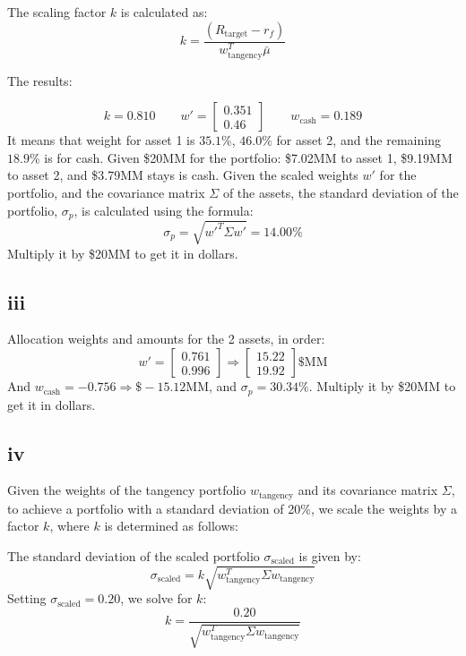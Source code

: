 \documentclass{article}
\begin{document}
The scaling factor \( k \) is calculated as:
\[ k = \frac{(R_{\text{target}} - r_f)}{w_{\text{tangency}}^T \bar{\mu}} \]

The results:

$$k=0.810\qquad w' = \displaystyle \left[\begin{matrix}0.351\\0.46\end{matrix}\right] \qquad w_{\text{cash}} = 0.189  $$
It means that weight for asset 1 is
$35.1\%$, $46.0\%$ for asset 2,
and the remaining $18.9\%$ is for cash.
Given \$20MM for the portfolio: \$7.02MM to asset 1, \$9.19MM to asset 2, and \$3.79MM stays is cash.
Given the scaled weights \( w' \) for the portfolio, and the covariance matrix \( \Sigma \) of the assets, the standard deviation of the portfolio, \( \sigma_p \), is calculated using the formula:
\[
    \sigma_p = \sqrt{w'^T \Sigma w'} = 14.00\%
\]
Multiply it by \$20MM to get it in dollars.
\subsection*{iii}
Allocation weights and amounts for the 2 assets, in order:
$$\displaystyle w' = \left[\begin{matrix}0.761\\0.996\end{matrix}\right] \Rightarrow \displaystyle \left[\begin{matrix}15.22\\19.92\end{matrix}\right]\$\text{MM}$$
And $w_{\text{cash}} = -0.756 \Rightarrow \$-15.12\text{MM}$, and $\sigma_p = 30.34\%$.
Multiply it by \$20MM to get it in dollars.

\subsection*{iv}
Given the weights of the tangency portfolio \( w_{\text{tangency}} \) and its covariance matrix \( \Sigma \), to achieve a portfolio with a standard deviation of 20\%, we scale the weights by a factor \( k \), where \( k \) is determined as follows:

The standard deviation of the scaled portfolio \( \sigma_{\text{scaled}} \) is given by:
\[ \sigma_{\text{scaled}} = k \sqrt{w_{\text{tangency}}^T \Sigma w_{\text{tangency}}} \]
Setting \( \sigma_{\text{scaled}} = 0.20 \), we solve for \( k \):
\[ k = \frac{0.20}{\sqrt{w_{\text{tangency}}^T \Sigma w_{\text{tangency}}}} \]
\end{document}
